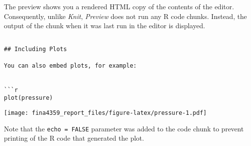 \documentclass[
]{article}
\begin{document}
The preview shows you a rendered HTML copy of the contents of the
editor. Consequently, unlike \emph{Knit}, \emph{Preview} does not run
any R code chunks. Instead, the output of the chunk when it was last run
in the editor is displayed.

\begin{verbatim}

## Including Plots

You can also embed plots, for example:


```r
plot(pressure)
\end{verbatim}

\texttt{[image: fina4359\_report\_files/figure-latex/pressure-1.pdf]}

Note that the \texttt{echo\ =\ FALSE} parameter was added to the code
chunk to prevent printing of the R code that generated the plot.
\end{document}
